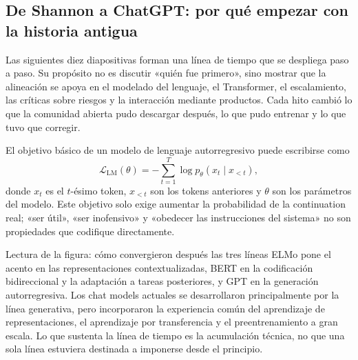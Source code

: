 
\subsection{De Shannon a ChatGPT: por qué empezar con la historia antigua}

Las siguientes diez diapositivas forman una línea de tiempo que se despliega paso a paso. Su propósito no es discutir «quién fue primero», sino mostrar que la alineación se apoya en el modelado del lenguaje, el Transformer, el escalamiento, las críticas sobre riesgos y la interacción mediante productos. Cada hito cambió lo que la comunidad abierta pudo descargar después, lo que pudo entrenar y lo que tuvo que corregir.


El objetivo básico de un modelo de lenguaje autorregresivo puede escribirse como
\[
\mathcal{L}_{\mathrm{LM}}(\theta)=-\sum_{t=1}^{T}\log p_{\theta}(x_t\mid x_{<t}),
\]
donde $x_t$ es el $t$-ésimo token, $x_{<t}$ son los tokens anteriores y $\theta$ son los parámetros del modelo. Este objetivo solo exige aumentar la probabilidad de la continuation real; «ser útil», «ser inofensivo» y «obedecer las instrucciones del sistema» no son propiedades que codifique directamente.



\begin{knowledgebox}{Lectura de la figura: cómo convergieron después las tres líneas}
ELMo pone el acento en las representaciones contextualizadas, BERT en la codificación bidireccional y la adaptación a tareas posteriores, y GPT en la generación autorregresiva. Los chat models actuales se desarrollaron principalmente por la línea generativa, pero incorporaron la experiencia común del aprendizaje de representaciones, el aprendizaje por transferencia y el preentrenamiento a gran escala. Lo que sustenta la línea de tiempo es la acumulación técnica, no que una sola línea estuviera destinada a imponerse desde el principio.
\end{knowledgebox}

